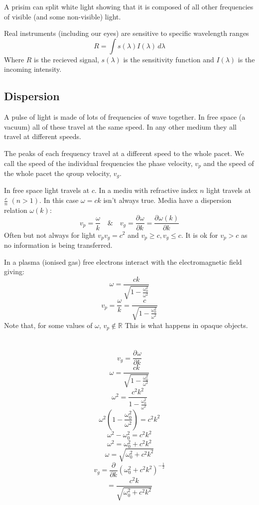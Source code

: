 \documentclass{article}
\newcommand{\pd}[3][]{\frac{\partial^{#1}{#2}}{\partial{#3}^{#1}}}
\newcommand{\pdiff}[2][]{\frac{\partial^{#1}}{\partial{#2}^{#1}}}
\newcommand{\bb}[1]{\mathbb{#1}}
\begin{document}
A prisim can split white light showing that it is composed of all other frequencies of visible (and some non-visible) light.

Real instruments (including our eyes) are sensitive to specific wavelength ranges
\[R=\int s(\lambda)I(\lambda)\,d\lambda\]
Where \(R\) is the recieved signal, \(s(\lambda)\) is the sensitivity function and \(I(\lambda)\) is the incoming intensity.

\subsection*{Dispersion}

A pulse of light is made of lots of frequencies of wave together. In free space (a vacuum) all of these travel at the same speed. In any other medium they all travel at different speeds.

The peaks of each frequency travel at a different speed to the whole pacet. We call the speed of the individual frequencies the phase velocity, \(v_p\) and the speed of the whole pacet the qroup velocity, \(v_g\).

In free space light travels at \(c\). In a mediu with refractive index \(n\) light travels at \(\frac cn\) \((n>1)\). In this case \(\omega=ck\) isn't always true. Media have a dispersion relation \(\omega(k)\):
\[v_p=\frac{\omega}{k}\quad\&\quad v_g=\pd{\omega}{k}=\pd{\omega(k)}{k}\]
Often but not always for light \(v_pv_g=c^2\) and \(v_p\ge c,v_g\le c\). It is ok for \(v_p>c\) as no information is being transferred.

In a plasma (ionised gas) free electrons interact with the electromagnetic field giving:
\[\omega=\frac{ck}{\sqrt{1-\frac{\omega_0^2}{\omega^2}}}\]
\[v_p=\frac{\omega}{k}=\frac{c}{\sqrt{1-\frac{\omega_0^2}{\omega^2}}}\]
Note that, for some values of \(\omega\), \(v_p\not\in\bb R\) This is what happens in opaque objects.

\section{}

\[v_g=\pd{\omega}{k}\]
\[\omega=\frac{ck}{\sqrt{1-\frac{\omega_0^2}{\omega^2}}}\]
\[\omega^2=\frac{c^2k^2}{1-\frac{\omega_0^2}{\omega^2}}\]
\[\omega^2\left(1-\frac{\omega_0^2}{\omega^2}\right)=c^2k^2\]
\[\omega^2-\omega_0^2=c^2k^2\]
\[\omega^2=\omega_0^2+c^2k^2\]
\[\omega=\sqrt{\omega_0^2+c^2k^2}\]
\[v_g=\pdiff{k}\left(\omega_0^2+c^2k^2\right)^{-\frac{1}{2}}\]
\[=\frac{c^2k}{\sqrt{\omega_0^2+c^2k^2}}\]
\end{document}

